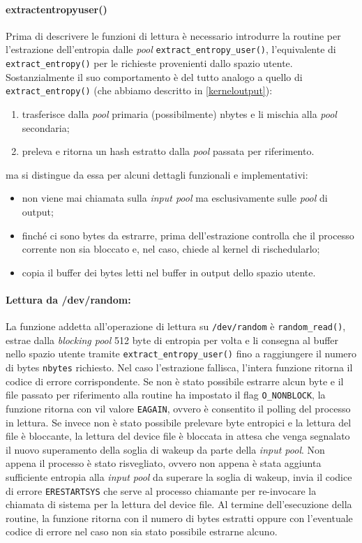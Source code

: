 \documentclass{article}
\begin{document}
\paragraph{extract\textunderscore{}entropy\textunderscore{}user()} Prima di
descrivere le funzioni di lettura è necessario introdurre la routine per
l'estrazione dell'entropia dalle \emph{pool} \verb+extract_entropy_user()+,
l'equivalente di \verb+extract_entropy()+ per
le richieste provenienti dallo spazio utente. \\
Sostanzialmente il suo comportamento è del tutto analogo a quello di
\verb+extract_entropy()+ (che abbiamo descritto in \ref{kerneloutput}):
\begin{enumerate}
  \item trasferisce dalla \emph{pool} primaria (possibilmente) nbytes e li
  mischia alla \emph{pool} secondaria;
  \item preleva e ritorna un hash estratto dalla \emph{pool} passata per
  riferimento.
\end{enumerate}
ma si distingue da essa per alcuni dettagli funzionali e implementativi:
 \begin{itemize}
   \item non viene mai chiamata sulla \emph{input pool} ma
   esclusivamente sulle \emph{pool} di output;
   \item finché ci sono bytes da estrarre, prima dell'estrazione controlla che
   il processo corrente non sia bloccato e, nel caso, chiede al kernel di
   rischedularlo;
   \item copia il buffer dei bytes letti nel buffer in output dello spazio
   utente.
 \end{itemize} 
 
 \paragraph{Lettura da /dev/random:} La funzione addetta
 all'operazione di lettura su \verb+/dev/random+ è \verb+random_read()+, estrae
 dalla \emph{blocking pool} 512 byte di entropia per volta e li consegna al
 buffer nello spazio utente tramite \verb+extract_entropy_user()+ fino a
 raggiungere il numero di bytes \verb+nbytes+ richiesto. Nel caso l'estrazione
 fallisca, l'intera funzione ritorna il codice di errore corrispondente.
 Se non è stato possibile estrarre alcun byte e il file passato per
 riferimento alla routine ha impostato il flag \verb+O_NONBLOCK+, la funzione
 ritorna con vil valore \verb+EAGAIN+, ovvero è consentito il polling del
 processo in lettura. Se invece non è stato possibile prelevare byte entropici e
 la lettura del file è bloccante, la lettura del device file è bloccata in
 attesa che venga segnalato il nuovo superamento della soglia di wakeup da parte
 della \emph{input pool}. Non appena il processo è stato risvegliato, ovvero non
 appena è stata aggiunta sufficiente entropia alla \emph{input pool} da
 superare la soglia di wakeup, invia il codice di errore \verb+ERESTARTSYS+ che
 serve al processo chiamante per re-invocare la chiamata di sistema per la
 lettura del device file. Al termine dell'esecuzione della routine, la funzione
 ritorna con il numero di bytes estratti oppure con l'eventuale codice di errore
 nel caso non sia stato possibile estrarne alcuno.
 
\end{document}
